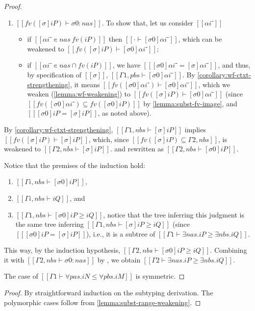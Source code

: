 \begin{proof}
\begin{enumerate}
    \item $[[  fv([σ]iP) ⊢ σ0 :{nas}]]$.
      To show that, let us consider $[[αi⁻]]$ 
      \begin{itemize}
        \item if $[[αi⁻ ∊ {nas} \ fv(iP)]]$ then
          $[[· ⊢ [σ0]αi⁻]]$, which can be weakened to 
          $[[ fv([σ]iP) ⊢ [σ0]αi⁻]]$;
        \item if $[[αi⁻ ∊ {nas} ∩ fv(iP)]]$, 
          we have $[[ [σ0]αi⁻ = [σ]αi⁻ ]]$, and thus, by
          specification of $[[σ]]$, $[[Γ1, pbs ⊢ [σ0]αi⁻ ]]$. 
          By \cref{corollary:wf-ctxt-strengthening}, 
          it means $[[ fv([σ0]αi⁻) ⊢ [σ0]αi⁻]]$,
          which we weaken (\cref{lemma:wf-weakening}) 
          to $[[ fv([σ]iP) ⊢ [σ0]αi⁻]]$ 
          (since $[[fv([σ0]αi⁻) ⊆ fv([σ0]iP)]]$ by \cref{lemma:subst-fv-image},
          and $[[ [σ0]iP = [σ]iP]]$, as noted above).
      \end{itemize} 
  \end{enumerate}

  By \cref{corollary:wf-ctxt-strengthening}, 
  $[[Γ1, nbs ⊢ [σ]iP]]$ implies 
  $[[  fv([σ]iP) ⊢ [σ]iP ]]$, which,
  since $[[fv([σ]iP) ⊆ Γ2, nbs]]$,
  is weakened to $[[Γ2, nbs ⊢ [σ]iP]]$.
  and rewritten as $[[Γ2, nbs ⊢ [σ0]iP]]$.
  
  Notice that the premises of the induction hold:
  \begin{enumerate}
    \item $[[Γi, nbs ⊢ [σ0]iP]]$, 
    \item $[[Γi, nbs ⊢ iQ]]$, and
    \item $[[Γ1, nbs ⊢ [σ0]iP ≥ iQ ]]$, 
      notice that the tree inferring this judgment 
      is the same tree inferring $[[Γ1, nbs ⊢ [σ]iP ≥ iQ ]]$ 
      (since $[[ [σ0]iP = [σ]iP]]$), i.e., 
      it is a subtree of $[[Γ1 ⊢ ∃nas.iP ≥ ∃nbs.iQ]]$.
  \end{enumerate}
  This way, by the induction hypothesis,
  $[[Γ2, nbs ⊢ [σ0]iP ≥ iQ ]]$.
  Combining it with $[[ Γ2, nbs ⊢ σ0 :{nas}]]$
  by ,
  we obtain $[[Γ2 ⊢ ∃nas.iP ≥ ∃nbs.iQ]]$.

  The case of $[[Γ1 ⊢ ∀pas.iN ≤ ∀pbs.iM]]$ is symmetric.
\end{proof}


\lemmaSubtWeakening*
\begin{proof}
  By straightforward induction on the subtyping derivation.
  The polymorphic cases follow from \cref{lemma:subst-range-weakening}.
\end{proof}

